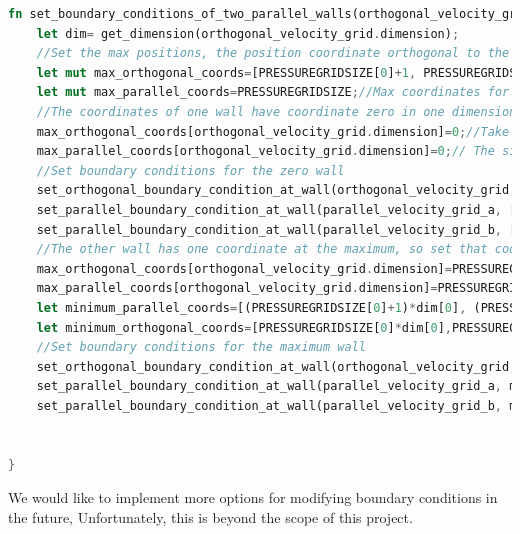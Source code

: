 \documentclass{article}
\begin{document}
\begin{lstlisting}[language=Rust, style=boxed, breaklines=true]
fn set_boundary_conditions_of_two_parallel_walls(orthogonal_velocity_grid: &mut VelocityGrid, parallel_velocity_grid_a: &mut VelocityGrid, parallel_velocity_grid_b: &mut VelocityGrid, orthogonal_velocity_grid_value: f32){
    let dim= get_dimension(orthogonal_velocity_grid.dimension);
    //Set the max positions, the position coordinate orthogonal to the wall will be set to zero later
    let mut max_orthogonal_coords=[PRESSUREGRIDSIZE[0]+1, PRESSUREGRIDSIZE[1]+1, PRESSUREGRIDSIZE[2]+1];//max coordinates for orthogonal velocities  
    let mut max_parallel_coords=PRESSUREGRIDSIZE;//Max coordinates for parallel velocities
    //The coordinates of one wall have coordinate zero in one dimension
    max_orthogonal_coords[orthogonal_velocity_grid.dimension]=0;//Take the wall that has the 0 coordinate in one direction
    max_parallel_coords[orthogonal_velocity_grid.dimension]=0;// The sizes of the parallel grids are the same in the other dimensions, so we will loop through the same values.
    //Set boundary conditions for the zero wall
    set_orthogonal_boundary_condition_at_wall(orthogonal_velocity_grid, [0,0,0], max_orthogonal_coords, orthogonal_velocity_grid_value);
    set_parallel_boundary_condition_at_wall(parallel_velocity_grid_a, [0,0,0], max_parallel_coords, false, orthogonal_velocity_grid.dimension);
    set_parallel_boundary_condition_at_wall(parallel_velocity_grid_b, [0,0,0], max_parallel_coords, false, orthogonal_velocity_grid.dimension);
    //The other wall has one coordinate at the maximum, so set that coordinate to the maximum
    max_orthogonal_coords[orthogonal_velocity_grid.dimension]=PRESSUREGRIDSIZE[orthogonal_velocity_grid.dimension];
    max_parallel_coords[orthogonal_velocity_grid.dimension]=PRESSUREGRIDSIZE[orthogonal_velocity_grid.dimension]+1;
    let minimum_parallel_coords=[(PRESSUREGRIDSIZE[0]+1)*dim[0], (PRESSUREGRIDSIZE[1]+1)*dim[1], (PRESSUREGRIDSIZE[2]+1)*dim[2]];
    let minimum_orthogonal_coords=[PRESSUREGRIDSIZE[0]*dim[0],PRESSUREGRIDSIZE[1]*dim[1], PRESSUREGRIDSIZE[2]*dim[2]];
    //Set boundary conditions for the maximum wall
    set_orthogonal_boundary_condition_at_wall(orthogonal_velocity_grid, minimum_orthogonal_coords, max_orthogonal_coords, orthogonal_velocity_grid_value);
    set_parallel_boundary_condition_at_wall(parallel_velocity_grid_a, minimum_parallel_coords, max_parallel_coords, true, orthogonal_velocity_grid.dimension);
    set_parallel_boundary_condition_at_wall(parallel_velocity_grid_b, minimum_parallel_coords, max_parallel_coords, true, orthogonal_velocity_grid.dimension);
    

}
\end{lstlisting}
We would like to implement more options for modifying boundary conditions in the future, Unfortunately, this is beyond the scope of this project.
\end{document}
